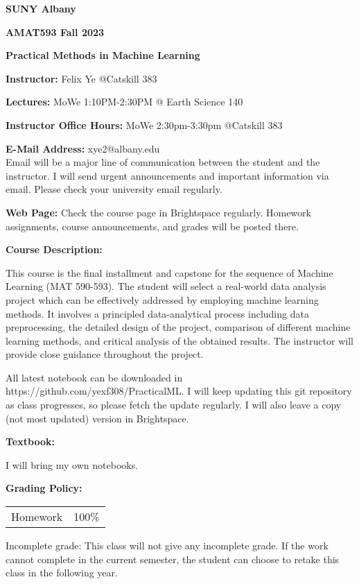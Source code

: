 \documentclass[a4paper,10pt]{article}
\begin{document}
\begin{center}

\textbf{SUNY Albany}

\textbf{AMAT593 Fall 2023}

\textbf{Practical Methods in Machine Learning}


\end{center}

\textbf{Instructor:} Felix Ye @Catskill 383 

\textbf{Lectures:} MoWe 1:10PM-2:30PM @ Earth Science 140

\textbf{Instructor Office Hours:}   MoWe 2:30pm-3:30pm  @Catskill 383


\textbf{E-Mail Address:} xye2@albany.edu\\
Email will be a major line of communication between the student and the instructor. I will send urgent announcements and important information via email. Please check your university email regularly.

\textbf{Web Page:}
Check the course page in Brightspace regularly. Homework assignments, course announcements, and grades will be posted there.


\textbf{Course Description:} 	
	
	
This course is the final installment and capstone for the sequence of Machine Learning (MAT 590-593).  The student will select a real-world data analysis project which can be effectively addressed by employing machine learning methods.  It involves a principled data-analytical process including data preprocessing, the detailed design of the project, comparison of different machine learning methods, and critical analysis of the obtained results.  The instructor will provide close guidance throughout the project. 

All latest notebook can be downloaded in https://github.com/yexf308/PracticalML. I will keep updating this git repository as class progresses, so please fetch the update regularly. I will also leave a copy (not most updated) version in Brightspace. 
 

\textbf{Textbook:} 

I will bring my own notebooks.

\textbf{Grading Policy:}

\begin{tabular}{lr}
Homework & 100\%\\
\end{tabular}


Incomplete grade: This class will not give any
incomplete grade. If the work cannot complete in the
current semester, the student can choose to retake this
class in the following year.
\end{document}
